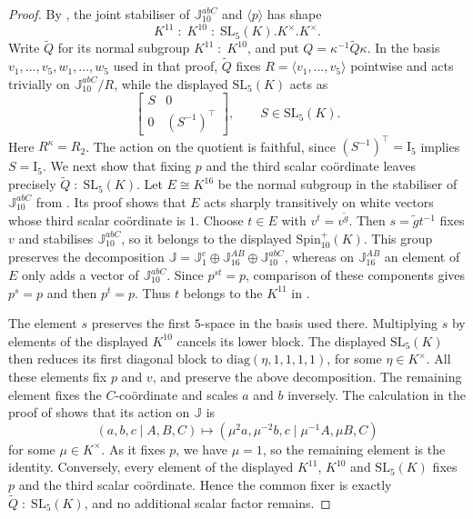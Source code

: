 \documentclass{amsart}
\def\cn{\mathord{{\;\!{:}\;\!}}}
\def\II{\mathord{\mathrm{I}}}
\newcommand{\diag}{\mathrm{diag}}
\newcommand{\SL}{\mathrm{SL}}
\newcommand{\Spin}{\mathrm{Spin}}
\newcommand{\J}{\mathbb{J}}
\newcommand{\T}{\top}
\theoremstyle{plain}
\numberwithin{theorem}{section}
\theoremstyle{definition}
\begin{document}
\begin{proof}
	By \cite[Lemma~11.5]{BSW1}, the joint stabiliser of $\J_{10}^{abC}$ and
	$\langle p\rangle$ has shape
	\begin{equation}
		K^{11}\cn K^{10}\cn\SL_5(K).K^{\times}.K^{\times}.
	\end{equation}
	Write $\widetilde Q$ for its normal subgroup $K^{11}\cn K^{10}$, and put
	$Q=\kappa^{-1}\widetilde Q\kappa$.  In the basis
	$v_1,\ldots,v_5,w_1,\ldots,w_5$ used in that proof, $\widetilde Q$ fixes
	$R=\langle v_1,\ldots,v_5\rangle$ pointwise and acts trivially on
	$\J_{10}^{abC}/R$, while the displayed $\SL_5(K)$ acts as
	\begin{equation*}
		\begin{bmatrix}S&0\\0&(S^{-1})^{\T}\end{bmatrix},\qquad S\in\SL_5(K).
	\end{equation*}
	Here $R^\kappa=R_2$.  The action on the quotient is faithful, since
	$(S^{-1})^{\T}=\II_5$ implies $S=\II_5$.
	We next show that fixing $p$ and the third scalar co\"{o}rdinate leaves
	precisely $\widetilde Q\cn\SL_5(K)$.
	Let $E\cong K^{16}$ be the normal subgroup in the stabiliser of
	$\J_{10}^{abC}$ from \cite[Theorem~11.2]{BSW1}.  Its proof shows that $E$
	acts sharply transitively on white vectors whose third scalar co\"{o}rdinate
	is $1$.  Choose $t\in E$ with $v^t=v^{\widetilde g}$.  Then
	$s=\widetilde g t^{-1}$ fixes $v$ and stabilises $\J_{10}^{abC}$, so it
	belongs to the displayed $\Spin_{10}^{+}(K)$.  This group preserves the
	decomposition $\J=\J_1^c\oplus\J_{16}^{AB}\oplus\J_{10}^{abC}$, whereas
	on $\J_{16}^{AB}$ an element of $E$ only adds a vector of
	$\J_{10}^{abC}$.  Since $p^{st}=p$, comparison of these components gives
	$p^s=p$ and then $p^t=p$.  Thus $t$ belongs to the $K^{11}$ in
	\cite[Lemma~11.5]{BSW1}.

	The element $s$ preserves the first $5$-space in the basis used there.
	Multiplying $s$ by elements of the displayed $K^{10}$ cancels its
	lower block.  The displayed $\SL_5(K)$ then reduces its first
	diagonal block to $\diag(\eta,1,1,1,1)$, for some $\eta\in K^{\times}$.
	All these elements fix $p$ and $v$, and preserve the above decomposition.
	The remaining element fixes the $C$-co\"{o}rdinate and scales $a$ and $b$
	inversely.  The calculation in the proof of \cite[Lemma~9.5]{BSW1} shows
	that its action on $\J$ is
	\begin{equation*}
		(a,b,c\mid A,B,C)\longmapsto
		(\mu^2a,\mu^{-2}b,c\mid\mu^{-1}A,\mu B,C)
	\end{equation*}
	for some $\mu\in K^{\times}$.  As it fixes $p$, we have $\mu=1$, so the
	remaining element is the identity.  Conversely, every element of the
	displayed $K^{11}$, $K^{10}$ and $\SL_5(K)$ fixes $p$ and the third scalar
	co\"{o}rdinate.  Hence the common fixer is exactly
	$\widetilde Q\cn\SL_5(K)$, and no additional scalar factor remains.


\end{proof}
\end{document}
